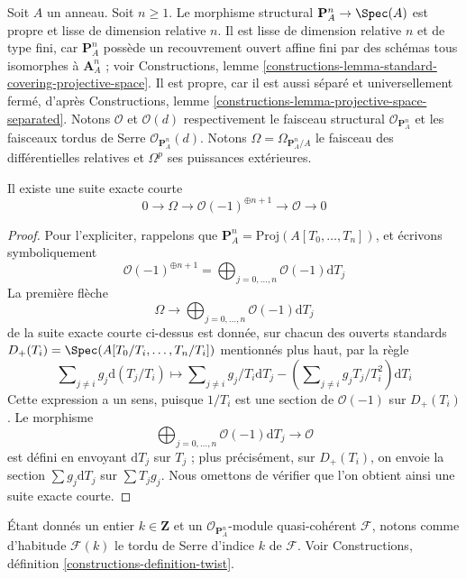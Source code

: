\noindent
Soit $A$ un anneau. Soit $n \geq 1$. Le morphisme structural
$\mathbf{P}^n_A \to \Spec(A)$ est propre et lisse de dimension relative
$n$. Il est lisse de dimension relative $n$ et de type fini,
car $\mathbf{P}^n_A$ possède un recouvrement ouvert affine fini par des schémas tous
isomorphes à $\mathbf{A}^n_A$ ; voir Constructions, lemme
\ref{constructions-lemma-standard-covering-projective-space}.
Il est propre, car il est aussi séparé et universellement fermé,
d'après Constructions, lemme \ref{constructions-lemma-projective-space-separated}.
Notons $\mathcal{O}$ et $\mathcal{O}(d)$ respectivement le faisceau structural
$\mathcal{O}_{\mathbf{P}^n_A}$ et les faisceaux tordus de Serre
$\mathcal{O}_{\mathbf{P}^n_A}(d)$.
Notons $\Omega = \Omega_{\mathbf{P}^n_A/A}$ le faisceau
des différentielles relatives et $\Omega^p$ ses puissances extérieures.

\begin{lemma}
\label{lemma-euler-sequence}
Il existe une suite exacte courte
$$
0 \to \Omega \to \mathcal{O}(-1)^{\oplus n + 1} \to \mathcal{O} \to 0
$$
\end{lemma}

\begin{proof}
Pour l'expliciter, rappelons que
$\mathbf{P}^n_A = \text{Proj}(A[T_0, \ldots, T_n])$,
et écrivons symboliquement
$$
\mathcal{O}(-1)^{\oplus n + 1} =
\bigoplus\nolimits_{j = 0, \ldots, n} \mathcal{O}(-1) \text{d}T_j
$$
La première flèche
$$
\Omega \to
\bigoplus\nolimits_{j = 0, \ldots, n} \mathcal{O}(-1) \text{d}T_j
$$
de la suite exacte courte ci-dessus
est donnée, sur chacun des ouverts standards
$D_+(T_i) = \Spec(A[T_0/T_i, \ldots, T_n/T_i])$
mentionnés plus haut, par la règle
$$
\sum\nolimits_{j \not = i} g_j \text{d}(T_j/T_i)
\longmapsto
\sum\nolimits_{j \not = i} g_j/T_i \text{d}T_j
- (\sum\nolimits_{j \not = i} g_jT_j/T_i^2) \text{d}T_i
$$
Cette expression a un sens, puisque $1/T_i$ est une section de $\mathcal{O}(-1)$
sur $D_+(T_i)$. Le morphisme
$$
\bigoplus\nolimits_{j = 0, \ldots, n} \mathcal{O}(-1) \text{d}T_j
\to
\mathcal{O}
$$
est défini en envoyant $\text{d}T_j$ sur $T_j$ ; plus précisément, sur
$D_+(T_i)$, on envoie la section $\sum g_j \text{d}T_j$ sur
$\sum T_jg_j$. Nous omettons de vérifier que l'on obtient ainsi
une suite exacte courte.
\end{proof}

\noindent
Étant donnés un entier $k \in \mathbf{Z}$ et un
$\mathcal{O}_{\mathbf{P}^n_A}$-module quasi-cohérent $\mathcal{F}$,
notons comme d'habitude $\mathcal{F}(k)$ le tordu de Serre d'indice $k$ de $\mathcal{F}$.
Voir Constructions, définition \ref{constructions-definition-twist}.

